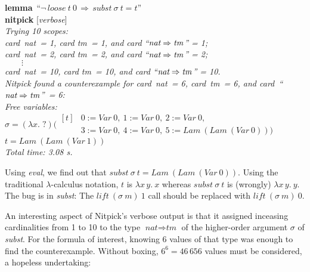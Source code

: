 \documentclass[a4paper,12pt]{article}
\def\unk{{?}}
\def\unkef{(\lambda x.\; \unk)}
\renewcommand\_{\hbox{\textunderscore\kern-.05ex}}
\begin{document}
\pre
\textbf{lemma}~``$\lnot\,\textit{loose}~t~0 \,\Longrightarrow\, \textit{subst}~\sigma~t = t$'' \\
\textbf{nitpick} [\textit{verbose}] \\[2\smallskipamount]
\slshape
Trying 10 scopes: \nopagebreak \\
\hbox{}\qquad \textit{card~nat}~= 1, \textit{card tm}~= 1, and \textit{card} ``$\textit{nat} \Rightarrow \textit{tm\/}$'' = 1; \\
\hbox{}\qquad \textit{card~nat}~= 2, \textit{card tm}~= 2, and \textit{card} ``$\textit{nat} \Rightarrow \textit{tm\/}$'' = 2; \\
\hbox{}\qquad $\qquad\vdots$ \\[.5\smallskipamount]
\hbox{}\qquad \textit{card~nat}~= 10, \textit{card tm}~= 10, and \textit{card} ``$\textit{nat} \Rightarrow \textit{tm\/}$'' = 10. \\[2\smallskipamount]
Nitpick found a counterexample for \textit{card~nat}~= 6, \textit{card~tm}~= 6,
and \textit{card}~``$\textit{nat} \Rightarrow \textit{tm\/}$''~= 6: \\[2\smallskipamount]
\hbox{}\qquad Free variables: \nopagebreak \\
\hbox{}\qquad\qquad $\sigma = \unkef(\!\begin{aligned}[t]
& 0 := \textit{Var}~0,\>
  1 := \textit{Var}~0,\>
  2 := \textit{Var}~0, \\[-2pt]
& 3 := \textit{Var}~0,\>
  4 := \textit{Var}~0,\>
  5 := \textit{Lam}~(\textit{Lam}~(\textit{Var}~0)))\end{aligned}$ \\
\hbox{}\qquad\qquad $t = \textit{Lam}~(\textit{Lam}~(\textit{Var}~1))$ \\[2\smallskipamount]
Total time: 3.08 s.
\postw

Using \textit{eval}, we find out that $\textit{subst}~\sigma~t =
\textit{Lam}~(\textit{Lam}~(\textit{Var}~0))$. Using the traditional
$\lambda$-calculus notation, $t$ is
$\lambda x\, y.\> x$ whereas $\textit{subst}~\sigma~t$ is (wrongly) $\lambda x\, y.\> y$.
The bug is in \textit{subst\/}: The $\textit{lift}~(\sigma~m)~1$ call should be
replaced with $\textit{lift}~(\sigma~m)~0$.

An interesting aspect of Nitpick's verbose output is that it assigned inceasing
cardinalities from 1 to 10 to the type $\textit{nat} \Rightarrow \textit{tm}$
of the higher-order argument $\sigma$ of \textit{subst}.
For the formula of interest, knowing 6 values of that type was enough to find
the counterexample. Without boxing, $6^6 = 46\,656$ values must be
considered, a hopeless undertaking:
\end{document}
